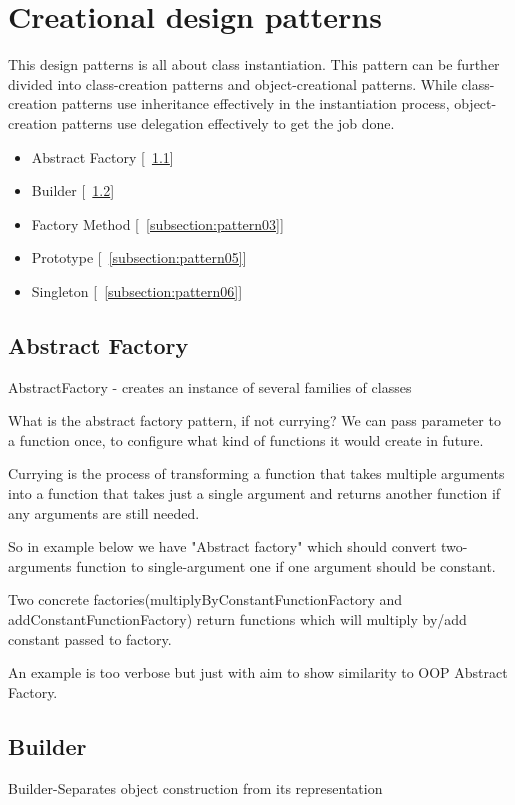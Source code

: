 \section{Creational design patterns}
This design patterns is all about class instantiation. This pattern can be further divided into class-creation patterns and object-creational patterns. While class-creation patterns use inheritance effectively in the instantiation process, object-creation patterns use delegation effectively to get the job done.
\begin{itemize}
	\item Abstract Factory [~\ref{subsection:pattern01}]
	\item Builder [~\ref{subsection:pattern02}]
	\item Factory Method [~\ref{subsection:pattern03}]
	\item Prototype [~\ref{subsection:pattern05}]
	\item Singleton [~\ref{subsection:pattern06}]
\end{itemize}

\subsection{Abstract Factory} \label{subsection:pattern01}
AbstractFactory - creates an instance of several families of classes

What is the abstract factory pattern, if not currying? We can pass parameter to a function once, to configure what kind of functions it would create in future.

Currying is the process of transforming a function that takes multiple arguments into a function that takes just a single argument and returns another function if any arguments are still needed.

So in example below we have "Abstract factory" which should convert two-arguments function to single-argument one if one argument should be constant.

Two concrete factories(multiplyByConstantFunctionFactory and addConstantFunctionFactory) return functions which will multiply by/add constant passed to factory.

An example is too verbose but just with aim to show similarity to OOP Abstract Factory.

\subsection{Builder} \label{subsection:pattern02}
Builder-Separates object construction from its representation

